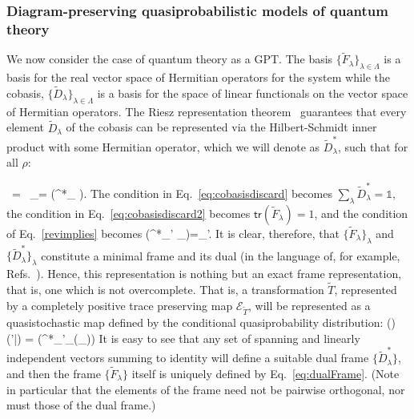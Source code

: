 \documentclass[onecolum,aps,groupedaddress,nofootinbib]{revtex4-2}
\begin{document}
\subsubsection{Diagram-preserving quasiprobabilistic models of quantum theory }
We now consider the case of quantum theory as a GPT. The basis $\{\widetilde{F}_{\lambda}\}_{\lambda\in\Lambda}$ is a basis for the real vector space of Hermitian operators for the system while the cobasis, $\{\widetilde{D}_{\lambda}\}_{\lambda\in\Lambda}$ is a basis for the space of linear functionals on the vector space of Hermitian operators.  The Riesz representation theorem~\cite{riesz1914demonstration} guarantees that every element $\widetilde{D}_{\lambda}$ of the cobasis can be represented via the Hilbert-Schmidt inner product with some Hermitian operator, which we will denote as $\widetilde{D}^*_{\lambda}$, such that for all $\rho$:
\beq
{}
\ = \
_{\lambda}\circ \rho = (^*_{\lambda} \rho).
\eeq
The condition in Eq.~\eqref{eq:cobasisdiscard} becomes $\sum_\lambda \widetilde{D}^*_\lambda = \mathds{1}$, the condition in Eq.~\eqref{eq:cobasisdiscard2} becomes $\mathsf{tr}(\widetilde{F}_\lambda)=1$, and the condition of Eq.~\eqref{revimplies} becomes
\beq\label{eq:dualFrame}
(^*_{\lambda'} _\lambda)=\delta_{\lambda\lambda'}.
\eeq
It is clear, therefore, that $\{ \widetilde{F}_\lambda \}_\lambda$ and $\{ \widetilde{D}^*_\lambda \}_\lambda$ constitute a  minimal frame and its dual (in the language of, for example, Refs.~\cite{ferrie2008frame}). Hence, this representation is nothing but an exact frame representation, that is, one which is not overcomplete.
That is, a transformation $\widetilde{T}$, represented by a completely positive trace preserving map $\mathcal{E}_{\widetilde{T}}$, will be represented as a quasistochastic map defined by the conditional quasiprobability distribution:
\beq
\hat{\xi}()({\lambda'}|\lambda) = (^*_{\lambda'}_{}(_\lambda))
\eeq
It is easy to see that any set of spanning and linearly independent vectors summing to identity will define a suitable dual frame $\{\widetilde{D}^*_\lambda\}$, and then the frame $\{\widetilde{F}_\lambda\}$ itself is uniquely defined by Eq.~\eqref{eq:dualFrame}. (Note in particular that the elements of the frame need not be pairwise orthogonal, nor must those of the dual frame.)
\end{document}
